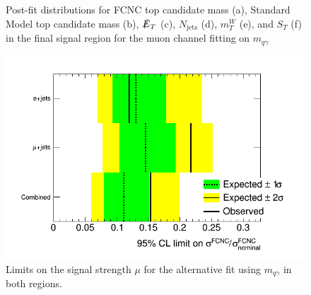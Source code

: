 \begin{figure}[]
\hfil  
{}
\caption{Post-fit distributions for FCNC top candidate mass (a), Standard Model top candidate mass (b), $\slashed{E}_T$ (c), $N_\text{jets}$ (d),  $m_T^W$ (e), and $S_T$ (f) in the final signal region for the muon channel fitting on  $m_{q\gamma}$}
\end{figure}

\begin{figure}[ht!]
	\centering
	\includegraphics[width=0.5\columnwidth]{../ThesisImages/RegionPlots/FinalRegions/Systematics/LimitPlot.png}
	\caption{Limits on the signal strength $\mu$ for the alternative fit using $m_{q\gamma}$ in both regions.
	}
\end{figure}

